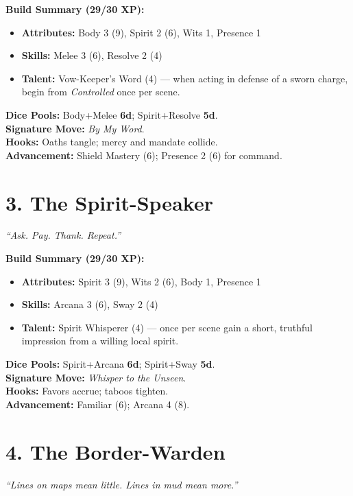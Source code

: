 \begin{multicols}{2}
\textbf{Build Summary (29/30 XP):}
\begin{itemize}
  \item \textbf{Attributes:} Body 3 (9), Spirit 2 (6), Wits 1, Presence 1
  \item \textbf{Skills:} Melee 3 (6), Resolve 2 (4)
  \item \textbf{Talent:} Vow-Keeper’s Word (4) — when acting in defense of a sworn charge, begin from \emph{Controlled} once per scene.
\end{itemize}
\textbf{Dice Pools:} Body+Melee \textbf{6d}; Spirit+Resolve \textbf{5d}.\\
\textbf{Signature Move:} \emph{By My Word}.\\
\textbf{Hooks:} Oaths tangle; mercy and mandate collide.\\
\textbf{Advancement:} Shield Mastery (6); Presence 2 (6) for command.

\section{3. The Spirit-Speaker}
\textit{“Ask. Pay. Thank. Repeat.”}

\textbf{Build Summary (29/30 XP):}
\begin{itemize}
  \item \textbf{Attributes:} Spirit 3 (9), Wits 2 (6), Body 1, Presence 1
  \item \textbf{Skills:} Arcana 3 (6), Sway 2 (4)
  \item \textbf{Talent:} Spirit Whisperer (4) — once per scene gain a short, truthful impression from a willing local spirit.
\end{itemize}
\textbf{Dice Pools:} Spirit+Arcana \textbf{6d}; Spirit+Sway \textbf{5d}.\\
\textbf{Signature Move:} \emph{Whisper to the Unseen}.\\
\textbf{Hooks:} Favors accrue; taboos tighten.\\
\textbf{Advancement:} Familiar (6); Arcana 4 (8).

\section{4. The Border-Warden}
\textit{“Lines on maps mean little. Lines in mud mean more.”}


\end{multicols}

